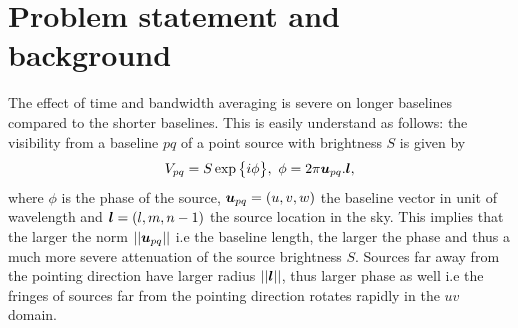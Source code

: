 \documentclass[useAMS,usenatbib]{mn2e}
\begin{document}
\section{Problem statement and background}
The effect of time and bandwidth averaging is severe on longer baselines compared to the shorter baselines.
This is easily understand as follows: the visibility from a baseline $pq$ of a point source 
with brightness $S$  is given by
\begin{equation}
V_{pq} = S \exp \big \{i \phi \big \},  ~ \phi = 2 \pi \bmath{u}_{pq}.\bmath{l},\label{eq:phase}
\end{equation}
where $\phi$ is the phase of the  source, 
 $\bmath{u}_{pq}=(u,v,w)$  the baseline vector in unit of wavelength and
  $\bmath{l}=(l,m,n-1)$ the source location in the sky. This implies 
that the larger the norm $||\bmath{u}_{pq}||$ i.e the baseline length, the larger the phase and thus a much more severe attenuation
of the source brightness $S$. Sources  far away
from the pointing direction have larger radius $||\bmath{l}||$, thus larger phase as well i.e
the fringes of  sources far from the pointing direction rotates rapidly in the $uv$ domain.
\end{document}
